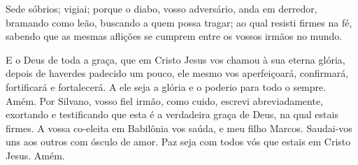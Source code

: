 Sede sóbrios; vigiai; porque o diabo, vosso adversário, anda em
derredor, bramando como leão, buscando a quem possa tragar; ao
qual resisti firmes na fé, sabendo que as mesmas aflições se cumprem
entre os vossos irmãos no mundo.

E o Deus de toda a graça, que em Cristo Jesus vos chamou à sua
eterna glória, depois de haverdes padecido um pouco, ele mesmo vos
aperfeiçoará, confirmará, fortificará e fortalecerá. A ele
seja a glória e o poderio para todo o sempre. Amém. Por
Silvano, vosso fiel irmão, como cuido, escrevi abreviadamente,
exortando e testificando que esta é a verdadeira graça de Deus, na
qual estais firmes. A vossa co-eleita em Babilônia vos saúda,
e meu filho Marcos. Saudai-vos uns aos outros com ósculo de
amor. Paz seja com todos vós que estais em Cristo Jesus. Amém.

